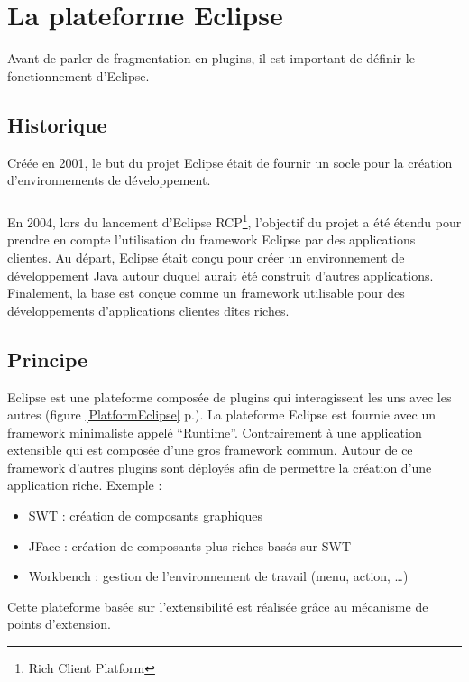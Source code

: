 \section{La plateforme Eclipse}

Avant de parler de fragmentation en plugins, il est important de définir le fonctionnement d'Eclipse.

\subsection{Historique}

Créée en 2001, le but du projet Eclipse était de fournir un socle pour la création d'environnements de développement.
\subparagraph*{}
En 2004, lors du lancement d'Eclipse RCP\footnote{Rich Client Platform}, l'objectif du projet a été étendu pour prendre en compte l'utilisation du framework Eclipse par des applications clientes.
Au départ, Eclipse était conçu pour créer un environnement de développement Java autour duquel aurait été construit d'autres applications.
Finalement, la base est conçue comme un framework utilisable pour des développements d'applications clientes dîtes riches.

\subsection{Principe}

Eclipse est une plateforme composée de plugins qui interagissent les uns avec les autres (figure \ref{PlatformEclipse} p.\pageref{PlatformEclipse}).
La plateforme Eclipse est fournie avec un framework minimaliste appelé ``Runtime''. Contrairement à une application extensible qui est composée d'une gros framework commun.
Autour de ce framework d'autres plugins sont déployés afin de permettre la création d'une application riche.
Exemple : 
\begin{itemize}
  \item SWT : création de composants graphiques
  \item JFace : création de composants plus riches basés sur SWT
  \item Workbench : gestion de l'environnement de travail (menu, action, \ldots)
\end{itemize}

Cette plateforme basée sur l'extensibilité est réalisée grâce au mécanisme de points d'extension.

